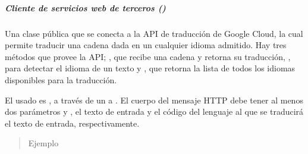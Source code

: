 \subparagraph{Cliente de servicios web de terceros ()}
\label{\detokenize{chapter_two/desc_cloudnao:cliente-de-servicios-web-de-terceros-tpa-client-libraries}}\label{\detokenize{chapter_two/desc_cloudnao:module-app.tpa_client_libraries.google_cloud_translation}}

\begin{fulllineitems}
\label{\detokenize{chapter_two/desc_cloudnao:app.tpa_client_libraries.google_cloud_translation.GoogleCloudTranslation}}
Una clase pública que se conecta a la API de traducción de Google Cloud,
la cual permite traducir una cadena dada en un cualquier idioma admitido.
Hay tres métodos que provee la API; , que recibe una cadena y
retorna su traducción, , para detectar el idioma de un texto y
, que retorna la lista de todos los idiomas disponibles para
la traducción.

El usado es , a través de un  a
. El cuerpo
del mensaje HTTP debe tener al menos dos parámetros  y ,
el texto de entrada y el código del lenguaje al que se traducirá el texto
de entrada, respectivamente.
\begin{quote}\begin{description}
\item[{Ejemplo}] \leavevmode
\end{description}\end{quote}

\begin{sphinxVerbatim}[commandchars=\\\{\}]
   
  
 
\end{sphinxVerbatim}


\end{fulllineitems}
